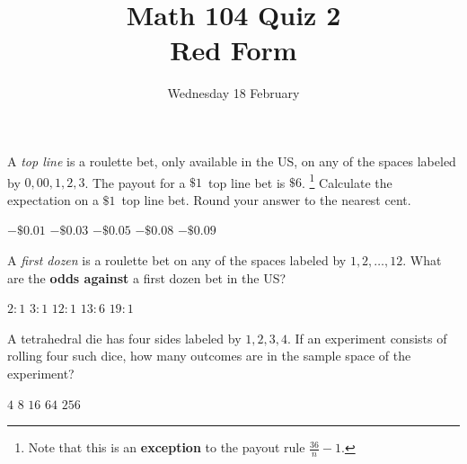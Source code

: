 \documentclass[answers,12pt]{exam}
\title{Math 104 Quiz 2\\Red Form}
\date{Wednesday 18 February}
\begin{document}
\maketitle
\begin{center}
\end{center}

\begin{questions}
\question A {\em top line} is a roulette bet,
only available in the US, on any of the spaces labeled by
$0,00,1,2,3$. The payout for a $\$1$~top line bet
is $\$6$.
\footnote{Note that this is an {\bf exception} to the
payout rule $\frac{36}{n}-1$.}
Calculate the expectation on a $\$1$~top line bet.
Round your answer to the nearest cent.\\
\begin{oneparchoices}
\choice $-\$0.01$
\choice $-\$0.03$ %
\choice $-\$0.05$ %
\correctchoice $-\$0.08$
\choice $-\$0.09$
\end{oneparchoices}

\question A {\em first dozen} is a roulette bet
on any of the spaces labeled by $1,2,\ldots,12$. What are the
{\bf odds against} a first dozen bet in the US?\\
\begin{oneparchoices}
\choice $2:1$ %
\choice $3:1$ %
\choice $12:1$ %
\correctchoice $13:6$
\choice $19:1$ %
\end{oneparchoices}

\question A tetrahedral die has four sides labeled 
by $1,2,3,4$.
If an experiment consists of rolling four such dice, how
many outcomes are in the sample space of the experiment?\\
\begin{oneparchoices}
\choice $4$ %
\choice $8$
\choice $16$ %
\choice $64$ %
\correctchoice $256$
\end{oneparchoices}



\end{questions}
\end{document}
